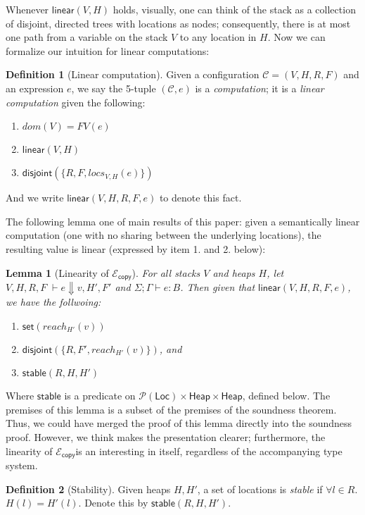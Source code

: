 \documentclass{easychair}
\newcommand{\ms}[1]{\ensuremath{\mathsf{#1}}}
\newcommand{\na}[1]{\mathsf{linear}(#1)}
\newcommand{\stable}[1]{\mathsf{stable}(#1)}
\newcommand{\dist}[1]{\mathsf{disjoint}(#1)}
\newcommand{\wfc}[5]{\mathsf{linear}(#1,#2,#3,#4,#5)}
\newcommand{\copySem}{\ensuremath{\mathcal{E}_{\ms{copy}}}}
\newtheorem{lemma}[theorem]{Lemma}
\theoremstyle{definition}
\newtheorem{definition}{Definition}
\begin{document}
Whenever $\na{V,H}$ holds, visually, one can think of the 
stack as a collection of disjoint, directed trees with locations as nodes; 
consequently, there is at 
most one path from a variable on the stack $V$ to any location in $H$. Now we can 
formalize our intuition for linear computations: 

\begin{definition}[Linear computation]
Given a configuration $\mathcal{C} = (V,H,R,F)$ and an expression $e$, 
we say the 5-tuple $(\mathcal{C},e)$ is a \emph{computation}; it is a \emph{linear computation} 
given the following:
\begin{enumerate}
\item $dom(V) = FV(e)$
\item $\na{V,H}$
\item $\dist{\{R,F,locs_{V,H}(e)\}}$
\end{enumerate} 
And we write $\wfc{V}{H}{R}{F}{e}$ to denote this fact.
\end{definition}

The following lemma one of main results of this paper: given a semantically linear computation 
(one with no sharing between the underlying locations), the resulting value is linear 
(expressed by item 1. and 2. below):
\begin{lemma}[Linearity of \copySem]\label{itm:na}
For all stacks $V$ and heaps $H$, let  $V,H,R,F \; \vdash e \Downarrow v, H', F'$ 
and $\Sigma; \Gamma \vdash e : B$. Then given that $\wfc{V}{H}{R}{F}{e}$, we have the follwoing: 
\begin{enumerate}
\item $\ms{set}(reach_{H'}(v))$
\item $\dist{\{R,F',reach_{H'}(v)\}}$, and
\item $\stable{R,H,H'}$
\end{enumerate}
\end{lemma}

Where $\ms{stable}$ is a predicate on $\mathcal{P}(\ms{Loc}) \times \ms{Heap} \times \ms{Heap}$, defined
below. The premises of this lemma is a subset of the premises of the soundness theorem. 
Thus, we could have
merged the proof of this lemma directly into the soundness proof. However, we think makes the 
presentation clearer; furthermore, the linearity of \copySem is an interesting in itself, 
regardless of the accompanying type system. 

\begin{definition}[Stability]
Given heaps $H,H'$, a set of locations is \emph{stable} if $\forall l \in R$. $H(l) = H'(l)$. Denote this by
$\stable{R,H,H'}$.
\end{definition}
\end{document}
